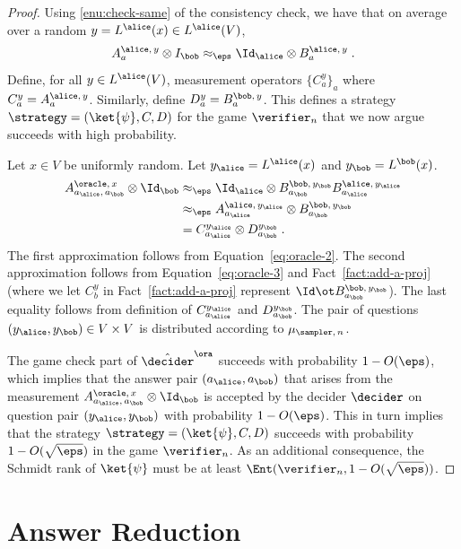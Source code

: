 \begin{proof}
  Using \cref{enu:check-same} of the consistency check, we have that on
  average over a random $y = L^\alice(x) \in L^\alice(V)$,
  \begin{equation}
    \label{eq:oracle-3}
    A^{\alice,\, y}_{a} \otimes I_\bob \approx_\eps
    \Id_\alice \otimes B^{\alice,\, y}_{a}\;.
  \end{equation}
  Define, for all $y \in L^\alice(V)$, measurement operators $\{C^y_a\}_a$ where
  $C^y_a = A^{\alice,\, y}_a$.
  Similarly, define $D^y_a = B^{\bob,\, y}_a$.
  This defines a strategy $\strategy = (\ket{\psi},C,D)$ for the game
  $\verifier_n$ that we now argue succeeds with high probability.
    
  Let $x \in V$ be uniformly random.
  Let $y_\alice = L^\alice(x)$ and $y_\bob =L^\bob(x)$.
  \begin{align*}
    A^{\oracle,\, x}_{a_\alice,\, a_\bob} \otimes \Id_\bob
    & \approx_\eps \Id_\alice \otimes
      B^{\bob,\, y_\bob}_{a_\bob} B^{\alice,\, y_\alice}_{a_\alice} \\
    & \approx_{\eps} A^{\alice,\, y_\alice}_{a_\alice} \otimes
      B^{\bob,\, y_\bob}_{a_\bob} \\
    & = C^{y_\alice}_{a_\alice} \otimes D^{y_\bob}_{a_\bob}\;.
  \end{align*}
	The first approximation follows from Equation~\eqref{eq:oracle-2}.
  The second approximation follows from Equation~\eqref{eq:oracle-3} and
  Fact~\ref{fact:add-a-proj} (where we let $C^y_b$ in Fact~\ref{fact:add-a-proj}
  represent $\Id\ot B^{\bob,\, y_\bob}_{a_\bob}$).
  The last equality follows from definition of $C^{y_\alice}_{a_\alice}$ and
  $D^{y_\bob}_{a_\bob}$.
  The pair of questions $(y_\alice, y_\bob) \in V \times V$ is distributed
  according to $\mu_{\sampler,\, n}$.

  The game check part of $\tdora$ succeeds with probability $1 -
  O(\eps)$, which implies that the answer pair $(a_\alice, a_\bob)$ that arises
  from the measurement $A^{\oracle,\, x}_{a_\alice,\, a_\bob} \otimes \Id_\bob$
  is accepted by the decider $\decider$ on question pair $(y_\alice,y_\bob)$
  with probability $1 - O(\eps)$.
  This in turn implies that the strategy $\strategy = (\ket{\psi},C,D)$ succeeds
  with probability $1 - O(\sqrt{\eps})$ in the game $\verifier_n$.
  As an additional consequence, the Schmidt rank of $\ket{\psi}$ must be at
  least $\Ent(\verifier_n, 1 - O(\sqrt{\eps}))$.
\end{proof}

 
\section{Answer Reduction}
